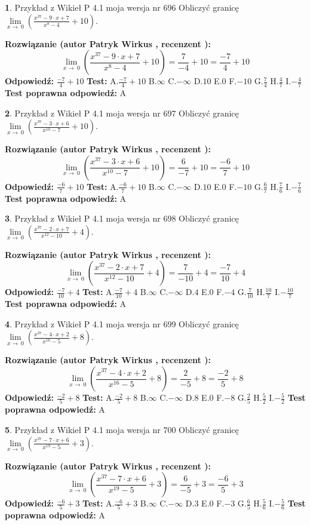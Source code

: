 \documentclass[12pt, a4paper]{article}
\theoremstyle{definition} %
\newtheorem{zad}{}
\newcommand{\zadStart}[1]{\begin{zad}#1\newline}
\newcommand{\zadStop}{\end{zad}}
\newcommand{\rozwStart}[2]{\noindent \textbf{Rozwiązanie (autor #1 , recenzent #2): }\newline}
\newcommand{\rozwStop}{\newline}
\newcommand{\odpStart}{\noindent \textbf{Odpowiedź:}\newline}
\newcommand{\odpStop}{\newline}
\newcommand{\testStart}{\noindent \textbf{Test:}\newline}
\newcommand{\testStop}{\newline}
\newcommand{\kluczStart}{\noindent \textbf{Test poprawna odpowiedź:}\newline}
\newcommand{\kluczStop}{\newline}
\begin{document}
\zadStart{Przykład z Wikieł P 4.1 moja wersja nr 696}
Obliczyć granicę $\lim\limits_{x\to\ 0}(\frac{x^{37}-9 \cdot x +7}{x^{8}-4}+10)$.
\zadStop
\rozwStart{Patryk Wirkus}{}
$$\lim\limits_{x\to\ 0}(\frac{x^{37}-9 \cdot x +7}{x^{8}-4}+10)=\frac{7}{-4}+10=\frac{-7}{4}+10$$
\rozwStop
\odpStart
$\frac{-7}{4}+10$
\odpStop
\testStart
A.$\frac{-7}{4}+10$
B.$\infty$
C.$-\infty$
D.$10$
E.$0$
F.$-10$
G.$\frac{7}{4}$
H.$\frac{4}{7}$
I.$-\frac{4}{7}$
\testStop
\kluczStart
A
\kluczStop



\zadStart{Przykład z Wikieł P 4.1 moja wersja nr 697}
Obliczyć granicę $\lim\limits_{x\to\ 0}(\frac{x^{37}-3 \cdot x +6}{x^{10}-7}+10)$.
\zadStop
\rozwStart{Patryk Wirkus}{}
$$\lim\limits_{x\to\ 0}(\frac{x^{37}-3 \cdot x +6}{x^{10}-7}+10)=\frac{6}{-7}+10=\frac{-6}{7}+10$$
\rozwStop
\odpStart
$\frac{-6}{7}+10$
\odpStop
\testStart
A.$\frac{-6}{7}+10$
B.$\infty$
C.$-\infty$
D.$10$
E.$0$
F.$-10$
G.$\frac{6}{7}$
H.$\frac{7}{6}$
I.$-\frac{7}{6}$
\testStop
\kluczStart
A
\kluczStop



\zadStart{Przykład z Wikieł P 4.1 moja wersja nr 698}
Obliczyć granicę $\lim\limits_{x\to\ 0}(\frac{x^{37}-2 \cdot x +7}{x^{12}-10}+4)$.
\zadStop
\rozwStart{Patryk Wirkus}{}
$$\lim\limits_{x\to\ 0}(\frac{x^{37}-2 \cdot x +7}{x^{12}-10}+4)=\frac{7}{-10}+4=\frac{-7}{10}+4$$
\rozwStop
\odpStart
$\frac{-7}{10}+4$
\odpStop
\testStart
A.$\frac{-7}{10}+4$
B.$\infty$
C.$-\infty$
D.$4$
E.$0$
F.$-4$
G.$\frac{7}{10}$
H.$\frac{10}{7}$
I.$-\frac{10}{7}$
\testStop
\kluczStart
A
\kluczStop



\zadStart{Przykład z Wikieł P 4.1 moja wersja nr 699}
Obliczyć granicę $\lim\limits_{x\to\ 0}(\frac{x^{37}-4 \cdot x +2}{x^{16}-5}+8)$.
\zadStop
\rozwStart{Patryk Wirkus}{}
$$\lim\limits_{x\to\ 0}(\frac{x^{37}-4 \cdot x +2}{x^{16}-5}+8)=\frac{2}{-5}+8=\frac{-2}{5}+8$$
\rozwStop
\odpStart
$\frac{-2}{5}+8$
\odpStop
\testStart
A.$\frac{-2}{5}+8$
B.$\infty$
C.$-\infty$
D.$8$
E.$0$
F.$-8$
G.$\frac{2}{5}$
H.$\frac{5}{2}$
I.$-\frac{5}{2}$
\testStop
\kluczStart
A
\kluczStop



\zadStart{Przykład z Wikieł P 4.1 moja wersja nr 700}
Obliczyć granicę $\lim\limits_{x\to\ 0}(\frac{x^{37}-7 \cdot x +6}{x^{19}-5}+3)$.
\zadStop
\rozwStart{Patryk Wirkus}{}
$$\lim\limits_{x\to\ 0}(\frac{x^{37}-7 \cdot x +6}{x^{19}-5}+3)=\frac{6}{-5}+3=\frac{-6}{5}+3$$
\rozwStop
\odpStart
$\frac{-6}{5}+3$
\odpStop
\testStart
A.$\frac{-6}{5}+3$
B.$\infty$
C.$-\infty$
D.$3$
E.$0$
F.$-3$
G.$\frac{6}{5}$
H.$\frac{5}{6}$
I.$-\frac{5}{6}$
\testStop
\kluczStart
A
\kluczStop
\end{document}
